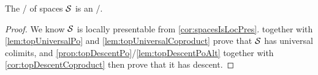 \begin{corollary}\label{cor:spacesIsInftyTop}
    The \inftycat/ of spaces $\mathcal{S}$ is an \inftytop/.
    \begin{proof}
        We know $\mathcal{S}$ is locally presentable from \cref{cor:spacesIsLocPres}.
         together with \cref{lem:topUniversalPo} and \cref{lem:topUniversalCoproduct} prove that $\mathcal{S}$ has universal colimits, and \cref{prop:topDescentPo}/\cref{lem:topDescentPoAlt} together with \cref{cor:topDescentCoproduct} then prove that it has descent.
    \end{proof}
\end{corollary}